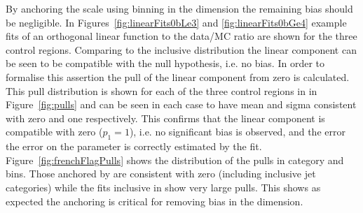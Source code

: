 By anchoring the scale using binning in the \scalht dimension the remaining
bias should be negligible. In Figures~\ref{fig:linearFits0bLe3} and \ref{fig:linearFits0bGe4} 
example fits of an orthogonal linear function to the data/MC ratio 
are shown for the three control regions. Comparing to the inclusive distribution 
the linear component can be seen to be compatible with the null hypothesis, 
i.e. no bias. In order to formalise this assertion 
the pull of the linear component from zero is calculated.
This pull distribution is shown for each of the three control regions in
in Figure~\ref{fig:pulls} and can be seen in each case to have mean and sigma
consistent with zero and one respectively. This confirms that the linear component 
is compatible with zero ($p_1 = 1$), i.e. no significant bias is observed, 
and the error the error on the parameter is correctly estimated by the fit.
Figure~\ref{fig:frenchFlagPulls} shows the distribution of the pulls 
in category and \scalht bins. Those anchored by \scalht are consistent
with zero (including inclusive jet categories) while the fits inclusive in \scalht
show very large pulls. This shows as expected the \scalht anchoring
is critical for removing bias in the \mht dimension. 


